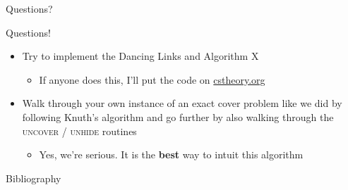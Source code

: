 \documentclass[aspectratio=169]{beamer}
\begin{document}


\begin{frame}{}
      \begin{center}
    {\color{sigma@mainblue} \LARGE Questions?}
  \end{center}
\end{frame}


\begin{frame}{Questions!}
    \begin{itemize}
        \item Try to implement the Dancing Links and Algorithm X \textcolor{sigma@mainblue}{\cite[Chapter~7.2.2.1]{TAOCP4B}}
        \begin{itemize}
            \item If anyone does this, I'll put the code on \href{https://www.cstheory.org/}{\textcolor{sigma@mainblue}{cstheory.org}}
        \end{itemize}
        \item Walk through your own instance of an exact cover problem like we did by following Knuth's algorithm and go further by also walking through the \textsc{uncover} / \textsc{unhide} routines
        \begin{itemize}
            \item Yes, we're serious. It is the \textbf{best} way to intuit this algorithm
        \end{itemize}
    \end{itemize}
    
\end{frame}

\begin{frame}{Bibliography}
    
    {\scriptsize }
\end{frame}
\end{document}
